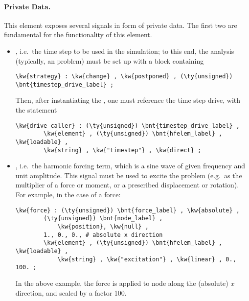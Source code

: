 \paragraph{Private Data.}
This element exposes several signals in form of private data.
The first two are fundamental for the functionality of this element.
\begin{itemize}
\item {}, i.e.\ the time step to be used in the simulation; to this end, the analysis (typically, an  problem) must be set up with a  block containing
\begin{Verbatim}[commandchars=\\\{\}]
    \kw{strategy} : \kw{change} , \kw{postponed} , (\ty{unsigned}) \bnt{timestep_drive_label} ;
\end{Verbatim}
Then, after instantiating the , one must reference the time step drive, with the statement
\begin{Verbatim}[commandchars=\\\{\}]
    \kw{drive caller} : (\ty{unsigned}) \bnt{timestep_drive_label} ,
        \kw{element} , (\ty{unsigned}) \bnt{hfelem_label} , \kw{loadable} ,
        \kw{string} , \kw{"timestep"} , \kw{direct} ;
\end{Verbatim}

\item {}, i.e.\ the harmonic forcing term, which is a sine wave of given frequency and unit amplitude.
This signal must be used to excite the problem (e.g.\ as the multiplier of a force or moment, or a prescribed displacement or rotation).
For example, in the case of a force:
\begin{Verbatim}[commandchars=\\\{\}]
    \kw{force} : (\ty{unsigned}) \bnt{force_label} , \kw{absolute} ,
        (\ty{unsigned}) \bnt{node_label} ,
            \kw{position}, \kw{null} ,
        1., 0., 0., # absolute x direction
        \kw{element} , (\ty{unsigned}) \bnt{hfelem_label} , \kw{loadable} ,
            \kw{string} , \kw{"excitation"} , \kw{linear} , 0., 100. ;
\end{Verbatim}
In the above example, the force is applied to node 
along the (absolute) $x$ direction, and scaled by a factor 100.


\end{itemize}
